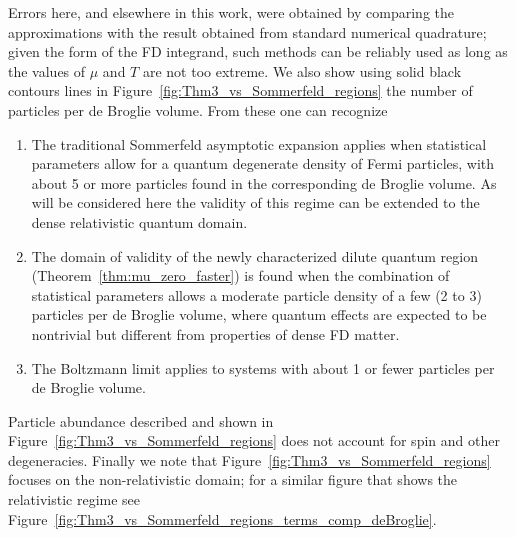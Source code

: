 \documentclass[sn-mathphys,Numbered]{sn-jnl}
\newcommand{\rf}[1]{Figure~{\ref{#1}}}
\newcommand{\rTh}[1]{Theorem~{\ref{#1}}}
\begin{document}
Errors here, and elsewhere in this work, were obtained by comparing the approximations with the result obtained from standard numerical quadrature; given the form of the FD integrand, such methods can be reliably used as long as the values of $\mu$ and $T$ are not too extreme. We also show using solid black contours lines in \rf{fig:Thm3_vs_Sommerfeld_regions} the number of particles per de Broglie volume. From these one can recognize
\begin{enumerate}
\item
The traditional Sommerfeld asymptotic expansion applies when statistical parameters allow for a quantum degenerate density of Fermi particles, with about 5 or more particles found in the corresponding de Broglie volume. As will be considered here the validity of this regime can be extended to the dense relativistic quantum domain. 
\item 
The domain of validity of the newly characterized dilute quantum region (\rTh{thm:mu_zero_faster}) is found when the combination of statistical parameters allows a moderate particle density of a few (2 to 3) particles per de Broglie volume, where quantum effects are expected to be nontrivial but different from properties of dense FD matter. 
\item
The Boltzmann limit applies to systems with about 1 or fewer particles per de Broglie volume. 
\end{enumerate}
Particle abundance described and shown in \rf{fig:Thm3_vs_Sommerfeld_regions} does not account for spin and other degeneracies. Finally we note that \rf{fig:Thm3_vs_Sommerfeld_regions} focuses on the non-relativistic domain; for a similar figure that shows the relativistic regime see \rf{fig:Thm3_vs_Sommerfeld_regions_terms_comp_deBroglie}.

\end{document}

